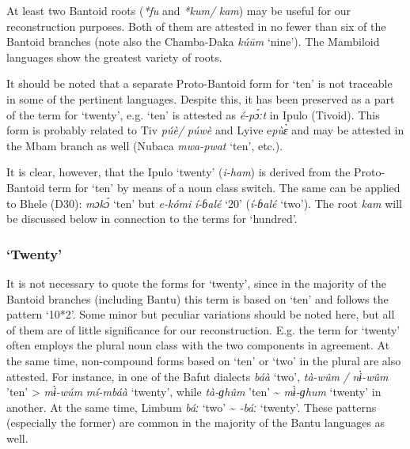 At least two Bantoid roots (\textit{*fu} and \textit{*kum/} \textit{kam}) may be useful for our reconstruction purposes. Both of them are attested in no fewer than six of the Bantoid branches (note also the Chamba-Daka \textit{k{\'{u}}{\={u}}m} `nine'). The Mambiloid languages show the greatest variety of roots.

It should be noted that a separate Proto-Bantoid form for `ten' is not traceable in some of the pertinent languages. Despite this, it has been preserved as a part of the term for `twenty', e.g. `ten' is attested as \textit{é-p{\'{ɔ}}ːt} in Ipulo (Tivoid). This form is probably related to Tiv \textit{p{\'{u}}è/} \textit{p{\'{u}}wè} and Lyive e\textit{pù{\`{ɛ}}} and may be attested in the Mbam branch as well (Nubaca \textit{mwa-pwat} ‘ten’, etc.).

It is clear, however, that the Ipulo `twenty' (\textit{i-ham}) is derived from the Proto-Bantoid term for `ten' by means of a noun class switch. The same can be applied to Bhele (D30): \textit{mɔk{\'{ɔ}}} ‘ten’ but \textit{e-kómi} \textit{í-ɓalé} ‘20’ (\textit{í-ɓalé} ‘two’). The root \textit{kam} will be discussed below in connection to the terms for `hundred'. 

\clearpage
\subsubsection{‘Twenty’}\label{sec:3.1.1.9}
It is not necessary to quote the forms for `twenty', since in the majority of the Bantoid branches (including Bantu) this term is based on `ten' and follows the pattern ‘10*2’. Some minor but peculiar variations should be noted here, but all of them are of little significance for our reconstruction. E.g. the term for `twenty' often employs the plural noun class with the two components in agreement. At the same time, non-compound forms based on `ten' or `two' in the plural are also attested. For instance, in one of the Bafut dialects \textit{báà} ‘two’, \textit{tà-w{\^{u}}m} \textit{/} \textit{n{\`{ɨ}}-w{\^{u}}m} ’ten’ > \textit{m{\`{ɨ}}-w{\'{u}}m} \textit{mí-mbáà} ‘twenty’, while \textit{tà-ɡh{\^{u}}m} ’ten’ {\textasciitilde} \textit{m{\`{ɨ}}-ɡhum} ‘twenty’ in another. At the same time, Limbum \textit{báː} ‘two’ {\textasciitilde} \textit{{}-báː} ‘twenty’. These patterns (especially the former) are common in the majority of the Bantu languages as well. 

